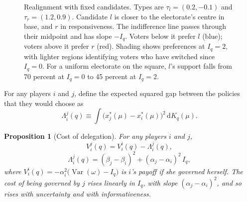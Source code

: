\documentclass[12pt,letterpaper]{article}
\newtheorem{proposition}{Proposition}
\begin{document}
\begin{figure}[t]
\centering
{}
\caption{Realignment with fixed candidates. Types are $\tau_l=(0.2,-0.1)$ and $\tau_r=(1.2,0.9)$. Candidate $l$ is closer to the electorate's centre in base, and $r$ in responsiveness. The indifference line passes through their midpoint and has slope $-I_q$. Voters below it prefer $l$ (blue); voters above it prefer $r$ (red). Shading shows preferences at $I_q=2$, with lighter regions identifying voters who have switched since $I_q=0$. For a uniform electorate on the square, $l$'s support falls from 70 percent at $I_q=0$ to 45 percent at $I_q=2$.}
\label{fig:realign}
\end{figure}

For any players $i$ and $j$, define the expected squared gap between the policies that they would choose as
\[
\Lambda_i^j(q)\equiv\int\big(x^*_j(\mu)-x^*_i(\mu)\big)^2\,\mathrm{d}K_q(\mu).
\]

\begin{proposition}[Cost of delegation]\label{prop:office}
For any players $i$ and $j$,
\[
V_i^j(q)=V_i^i(q)-\Lambda_i^j(q),
\]
\[
\Lambda_i^j(q)=(\beta_j-\beta_i)^2+(\alpha_j-\alpha_i)^2\,I_q ,
\]
where $V_i^i(q)=-\alpha_i^2\big(\operatorname{Var}(\omega)-I_q\big)$ is $i$'s payoff if she governed herself. The cost of being governed by $j$ rises linearly in $I_q$, with slope $(\alpha_j-\alpha_i)^2$, and so rises with uncertainty and with informativeness.
\end{proposition}
\end{document}
